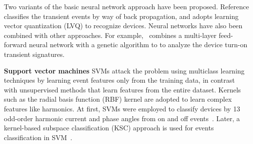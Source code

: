 %


Two variants of the basic neural network approach
have been proposed. %
Reference \cite{yang2007design} classifies the transient events by way of
back propagation,  
and \cite{chang2008load} adopts learning vector quantization (LVQ) to
recognize devices. %
Neural networks have also been combined with other approaches. For example,~\cite{chang2010newmethod} combines a multi-layer feed-forward neural network with a genetic algorithm to 
to analyze the device turn-on transient signatures. 

\textbf{Support vector machines}
SVMs attack the problem using multiclass learning techniques by learning 
event features only from the training data, in contrast with unsupervised methods that learn
features from the entire dataset. 
Kernels such as the radial basis function (RBF) kernel are adopted to learn complex features like harmonics. At first, SVMs were employed to classify devices by 13 odd-order harmonic current 
and phase angles from on and off events~\cite{onoda2000applying}. 
Later, a kernel-based subspace classification (KSC) approach is used for 
events classification in SVM~\cite{onoda2000applying2}. 

